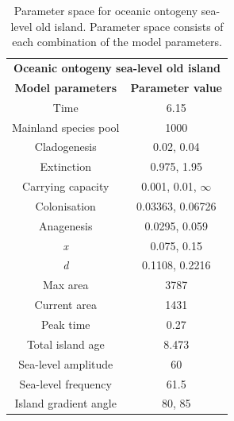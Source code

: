\begin{table}[ht]
    \centering
    \caption{Parameter space for oceanic ontogeny sea-level old island. Parameter space consists of each combination of the model parameters.}
    \begin{tabular}{ c | c }
        \multicolumn{2}{c}{\textbf{Oceanic ontogeny sea-level old island}} \\
        \textbf{Model parameters} & \textbf{Parameter value} \\ 
        \hline
        \hline
        Time & 6.15 \\
        \hline
        Mainland species pool & 1000 \\
        \hline
        Cladogenesis & 0.02, 0.04 \\
        \hline
        Extinction & 0.975, 1.95 \\
        \hline
        Carrying capacity & 0.001, 0.01, $\infty$ \\
        \hline
        Colonisation & 0.03363, 0.06726 \\
        \hline
        Anagenesis & 0.0295, 0.059 \\
        \hline
        \textit{x} & 0.075, 0.15 \\
        \hline
        \textit{d} & 0.1108, 0.2216 \\
        \hline
        Max area & 3787 \\
        \hline
        Current area & 1431 \\
        \hline
        Peak time & 0.27 \\
        \hline
        Total island age & 8.473 \\
        \hline
        Sea-level amplitude & 60 \\
        \hline
        Sea-level frequency & 61.5 \\
        \hline
        Island gradient angle & 80, 85 \\
    \end{tabular}
    \label{tab:oceanic_ontogeny_sea_level_old}
\end{table}

